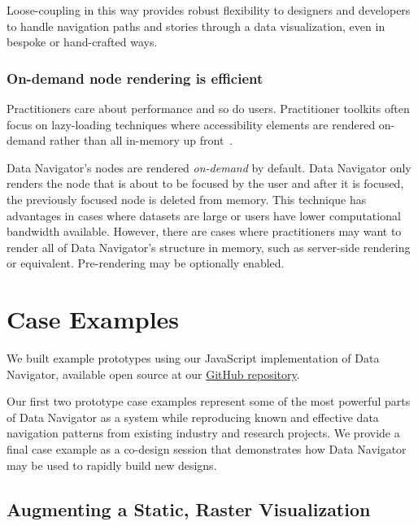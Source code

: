 \documentclass[journal]{vgtc}                %
\begin{document}
Loose-coupling in this way provides robust flexibility to designers and developers to handle navigation paths and stories through a data visualization, even in bespoke or hand-crafted ways.

\subsubsection{On-demand node rendering is efficient}
Practitioners care about performance and so do users. Practitioner toolkits often focus on lazy-loading techniques where accessibility elements are rendered on-demand rather than all in-memory up front~\cite{Elavsky2021Method,Zong2022Rich,Blanco2022olli}.

Data Navigator's nodes are rendered \textit{on-demand} by default. Data Navigator only renders the node that is about to be focused by the user and after it is focused, the previously focused node is deleted from memory. This technique has advantages in cases where datasets are large or users have lower computational bandwidth available. However, there are cases where practitioners may want to render all of Data Navigator's structure in memory, such as server-side rendering or equivalent. Pre-rendering may be optionally enabled.

\section{Case Examples}
We built example prototypes using our JavaScript implementation of Data Navigator, available open source at our \href{https://github.com/cmudig/data-navigator}{GitHub repository}.

Our first two prototype case examples represent some of the most powerful parts of Data Navigator as a system while reproducing known and effective data navigation patterns from existing industry and research projects. We provide a final case example as a co-design session that demonstrates how Data Navigator may be used to rapidly build new designs.

\subsection{Augmenting a Static, Raster Visualization}
\label{section:raster}
\end{document}
